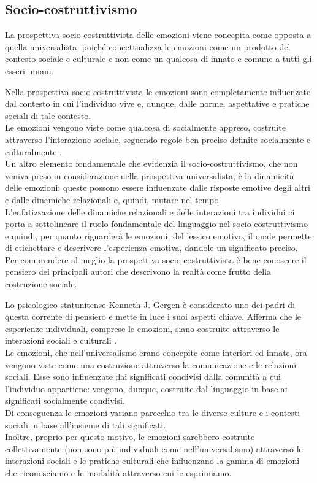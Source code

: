 \subsection{Socio-costruttivismo}
\label{subsec: Socio-costruttivismo}
La prospettiva socio-costruttivista delle emozioni viene concepita come opposta a quella universalista, poiché concettualizza le emozioni come un prodotto del contesto sociale e culturale e non come un qualcosa di innato e comune a tutti gli esseri umani. 

Nella prospettiva socio-costruttivista le emozioni sono completamente influenzate dal contesto in cui l'individuo vive e, dunque, dalle norme, aspettative e pratiche sociali di tale contesto.\\
Le emozioni vengono viste come qualcosa di socialmente appreso, costruite attraverso l'interazione sociale, seguendo regole ben precise definite socialmente e culturalmente \parencite{gergen}.\\
Un altro elemento fondamentale che evidenzia il socio-costruttivismo, che non veniva preso in considerazione nella prospettiva universalista, è la dinamicità delle emozioni: queste possono essere influenzate dalle risposte emotive degli altri e dalle dinamiche relazionali e, quindi, mutare nel tempo.\\
L'enfatizzazione delle dinamiche relazionali e delle interazioni tra individui ci porta a sottolineare il ruolo fondamentale del linguaggio nel socio-costruttivismo e quindi, per quanto riguarderà le emozioni, del lessico emotivo, il quale permette di etichettare e descrivere l'esperienza emotiva, dandole un significato preciso.\\
Per comprendere al meglio la prospettiva socio-costruttivista è bene conoscere il pensiero dei principali autori che descrivono la realtà come frutto della costruzione sociale.

Lo psicologico statunitense Kenneth J. Gergen è considerato uno dei padri di questa corrente di pensiero e mette in luce i suoi aspetti chiave.
Afferma che le esperienze individuali, comprese le emozioni, siano costruite attraverso le interazioni sociali e culturali \parencite{gergen}. \\
Le emozioni, che nell'universalismo erano concepite come interiori ed innate, ora vengono viste come una costruzione attraverso la comunicazione e le relazioni sociali. Esse sono influenzate dai significati condivisi dalla comunità a cui l'individuo appartiene: vengono, dunque, costruite dal linguaggio in base ai significati socialmente condivisi.\\
Di conseguenza le emozioni variano parecchio tra le diverse culture e i contesti sociali in base  all'insieme di tali significati.\\
Inoltre, proprio per questo motivo, le emozioni sarebbero costruite collettivamente (non sono più individuali come nell'universalismo) attraverso le interazioni sociali e le pratiche culturali che influenzano la gamma di emozioni che riconosciamo e le modalità attraverso cui le esprimiamo.

